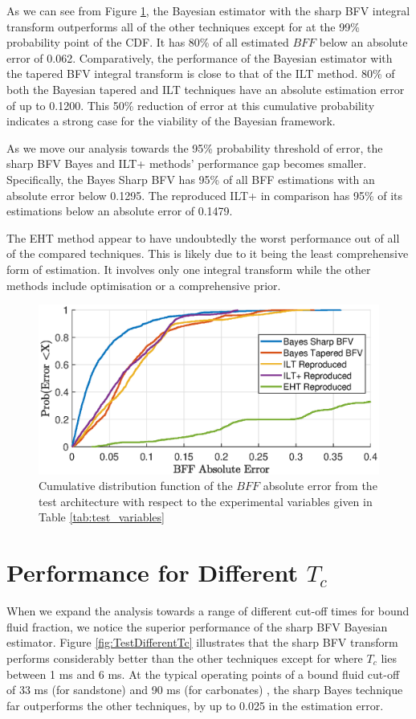 As we can see from Figure \ref{fig:cdf_all_tech}, the Bayesian estimator with the sharp BFV integral transform outperforms all of the other techniques except for at the 99\% probability point of the CDF. It has 80\% of all estimated $BFF$ below an absolute error of 0.062. Comparatively, the performance of the Bayesian estimator with the tapered BFV integral transform is close to that of the ILT method. 80\% of both the Bayesian tapered and ILT techniques have an absolute estimation error of up to 0.1200. This 50\% reduction of error at this cumulative probability indicates a strong case for the viability of the Bayesian framework.

As we move our analysis towards the 95\% probability threshold of error, the sharp BFV Bayes and ILT+ methods' performance gap becomes smaller. Specifically, the Bayes Sharp BFV has 95\% of all BFF estimations with an absolute error below 0.1295. The reproduced ILT+ in comparison has 95\% of its estimations below an absolute error of 0.1479. 

The EHT method appear to have undoubtedly the worst performance out of all of the compared techniques. This is likely due to it being the least comprehensive form of estimation. It involves only one integral transform while the other methods include optimisation or a comprehensive prior.

\begin{figure}[htb!]
    \centering
    \includegraphics[width=\textwidth]{evaluation/main_analysis_plot.eps}
    \caption{Cumulative distribution function of the $BFF$ absolute error from the test architecture with respect to the experimental variables given in Table \ref{tab:test_variables}}
    \label{fig:cdf_all_tech}
\end{figure}

\section{Performance for Different $T_c$} \label{section:differentTc_evaluation}
When we expand the analysis towards a range of different cut-off times for bound fluid fraction, we notice the superior performance of the sharp BFV Bayesian estimator. Figure \ref{fig:TestDifferentTc} illustrates that the sharp BFV transform performs considerably better than the other techniques except for where $T_c$ lies between 1 ms and 6 ms. At the typical operating points of a bound fluid cut-off of 33 ms (for sandstone) and 90 ms (for carbonates) \cite{wellLoggingBook}, the sharp Bayes technique far outperforms the other techniques, by up to 0.025 in the estimation error. 

